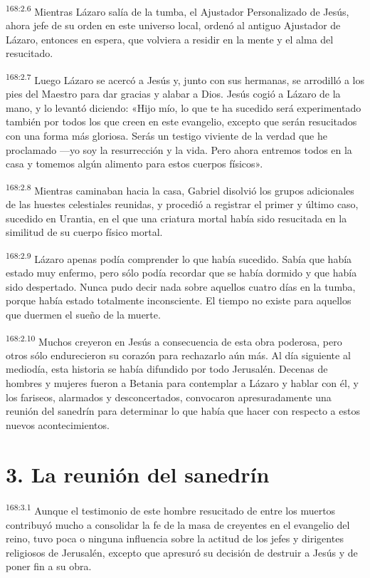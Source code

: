 \par 
\textsuperscript{168:2.6} Mientras Lázaro salía de la tumba, el Ajustador Personalizado de Jesús, ahora jefe de su orden en este universo local, ordenó al antiguo Ajustador de Lázaro, entonces en espera, que volviera a residir en la mente y el alma del resucitado.

\par 
\textsuperscript{168:2.7} Luego Lázaro se acercó a Jesús y, junto con sus hermanas, se arrodilló a los pies del Maestro para dar gracias y alabar a Dios. Jesús cogió a Lázaro de la mano, y lo levantó diciendo: «Hijo mío, lo que te ha sucedido será experimentado también por todos los que creen en este evangelio, excepto que serán resucitados con una forma más gloriosa. Serás un testigo viviente de la verdad que he proclamado ---yo soy la resurrección y la vida. Pero ahora entremos todos en la casa y tomemos algún alimento para estos cuerpos físicos».

\par 
\textsuperscript{168:2.8} Mientras caminaban hacia la casa, Gabriel disolvió los grupos adicionales de las huestes celestiales reunidas, y procedió a registrar el primer y último caso, sucedido en Urantia, en el que una criatura mortal había sido resucitada en la similitud de su cuerpo físico mortal.

\par 
\textsuperscript{168:2.9} Lázaro apenas podía comprender lo que había sucedido. Sabía que había estado muy enfermo, pero sólo podía recordar que se había dormido y que había sido despertado. Nunca pudo decir nada sobre aquellos cuatro días en la tumba, porque había estado totalmente inconsciente. El tiempo no existe para aquellos que duermen el sueño de la muerte.

\par 
\textsuperscript{168:2.10} Muchos creyeron en Jesús a consecuencia de esta obra poderosa, pero otros sólo endurecieron su corazón para rechazarlo aún más. Al día siguiente al mediodía, esta historia se había difundido por todo Jerusalén. Decenas de hombres y mujeres fueron a Betania para contemplar a Lázaro y hablar con él, y los fariseos, alarmados y desconcertados, convocaron apresuradamente una reunión del sanedrín para determinar lo que había que hacer con respecto a estos nuevos acontecimientos.

\section*{3. La reunión del sanedrín}
\par 
\textsuperscript{168:3.1} Aunque el testimonio de este hombre resucitado de entre los muertos contribuyó mucho a consolidar la fe de la masa de creyentes en el evangelio del reino, tuvo poca o ninguna influencia sobre la actitud de los jefes y dirigentes religiosos de Jerusalén, excepto que apresuró su decisión de destruir a Jesús y de poner fin a su obra.

